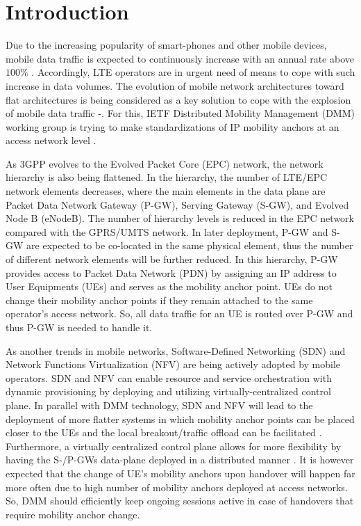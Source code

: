 \documentclass[runningheads,a4paper]{llncs}
\begin{document}
\section{Introduction}

Due to the increasing popularity of smart-phones and other mobile devices, mobile data traffic is expected to continuously increase with an annual rate above $100\%$ \cite{ref2}. Accordingly, LTE operators are in urgent need of means to cope with such increase in data volumes. The evolution of mobile network architectures toward flat architectures is being considered as a key solution to cope with the explosion of mobile data traffic \cite{ref3}-\cite{ref5}. For this, IETF Distributed Mobility Management (DMM) working group is trying to make standardizations of IP mobility anchors at an access network level \cite{ref6,ref7}. 

As 3GPP evolves to the Evolved Packet Core (EPC) network, the network hierarchy is also being flattened. In the hierarchy, the number of LTE/EPC network elements decreases, where the main elements in the data plane are Packet Data Network Gateway (P-GW), Serving Gateway (S-GW), and Evolved Node B (eNodeB). The number of hierarchy levels is reduced in the EPC network compared with the GPRS/UMTS network. In later deployment, P-GW and S-GW are expected to be co-located in the same physical element, thus the number of different network elements will be further reduced. In this hierarchy, P-GW provides access to Packet Data Network (PDN) by assigning an IP address to User Equipments (UEs) and serves as the mobility anchor point. UEs do not change their mobility anchor points if they remain attached to the same operator's access network. So, all data traffic for an UE is routed over P-GW and thus P-GW is needed to handle it.

As another trends in mobile networks, Software-Defined Networking (SDN) and Network Functions Virtualization (NFV) are being actively adopted by mobile operators. SDN and NFV can enable resource and service orchestration with dynamic provisioning by deploying and utilizing virtually-centralized control plane. In parallel with DMM technology, SDN and NFV will lead to the deployment of more flatter systems in which mobility anchor points can be placed closer to the UEs and the local breakout/traffic offload can be facilitated \cite{ref8}. Furthermore, a virtually centralized control plane allows for more flexibility by having the S-/P-GWs data-plane deployed in a distributed manner \cite{ref8-1}. It is however expected that the change of UE's mobility anchors upon handover will happen far more often due to high number of mobility anchors deployed at access networks. So, DMM should efficiently keep ongoing sessions active in case of handovers that require mobility anchor change. 
\end{document}
